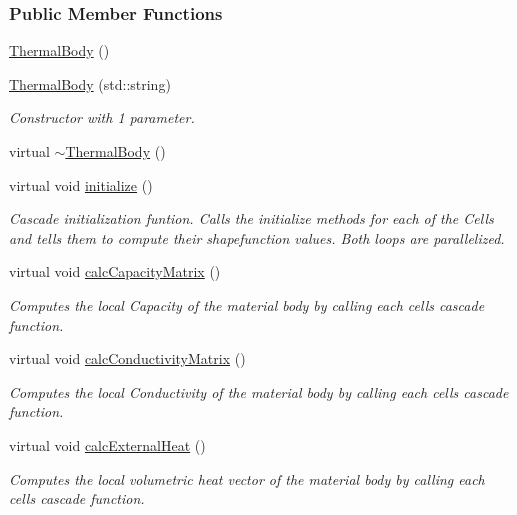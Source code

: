 \subsubsection*{Public Member Functions}
\begin{DoxyCompactItemize}
\item 
\hyperlink{classmknix_1_1_thermal_body_a41c675feaab004c04ff4f5ae0fb8a27e}{Thermal\+Body} ()
\item 
\hyperlink{classmknix_1_1_thermal_body_ac80f8070e47d8467ff2818a9d9095a8c}{Thermal\+Body} (std\+::string)
\begin{DoxyCompactList}\small\item\em Constructor with 1 parameter. \end{DoxyCompactList}\item 
virtual \hyperlink{classmknix_1_1_thermal_body_a5d4980cc538507f1f10111de9eca4018}{$\sim$\+Thermal\+Body} ()
\item 
virtual void \hyperlink{classmknix_1_1_thermal_body_a091d281dcf4425296ea643e0f338ae83}{initialize} ()
\begin{DoxyCompactList}\small\item\em Cascade initialization funtion. Calls the initialize methods for each of the Cells and tells them to compute their shapefunction values. Both loops are parallelized. \end{DoxyCompactList}\item 
virtual void \hyperlink{classmknix_1_1_thermal_body_a9908d53e5af15285c2fdd1d909779a81}{calc\+Capacity\+Matrix} ()
\begin{DoxyCompactList}\small\item\em Computes the local Capacity of the material body by calling each cell\textquotesingle{}s cascade function. \end{DoxyCompactList}\item 
virtual void \hyperlink{classmknix_1_1_thermal_body_ad5b8eca1b13f081a5b49b2fa87c6be73}{calc\+Conductivity\+Matrix} ()
\begin{DoxyCompactList}\small\item\em Computes the local Conductivity of the material body by calling each cell\textquotesingle{}s cascade function. \end{DoxyCompactList}\item 
virtual void \hyperlink{classmknix_1_1_thermal_body_a70ef05491f16086ff69788f745006a88}{calc\+External\+Heat} ()
\begin{DoxyCompactList}\small\item\em Computes the local volumetric heat vector of the material body by calling each cell\textquotesingle{}s cascade function. \end{DoxyCompactList}\item 

\end{DoxyCompactItemize}
